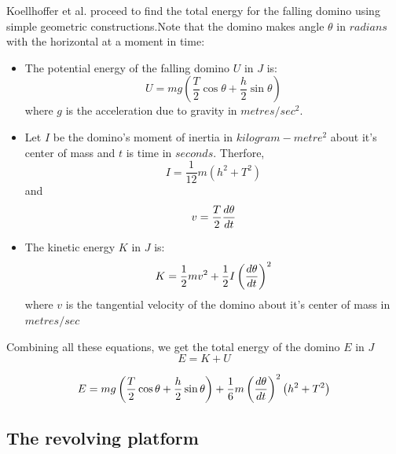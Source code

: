 \documentclass[11pt]{article}
\begin{document}
Koellhoffer et al. \cite{FallingDominoes} proceed to find the total energy for the falling domino using simple geometric constructions.Note that the domino makes angle $\theta$ in $radians$ with the horizontal at a moment in time:
\begin{itemize}
	\item The potential energy of the falling domino $U$ in $J$ is:
\begin{equation}
U = mg\left( \frac{T}{2} \cos\theta + \frac{h}{2}\sin\theta \right)
\end{equation}
	where $g$ is the acceleration due to gravity in $metres/{sec}^2$.
	\item Let $I$ be the domino's moment of inertia in $kilogram-metre^2$ about it's center of mass and $t$ is time in $seconds$. Therfore,
		\begin{equation}
			I = \frac{1}{12} m \left( h^2 + T^2 \right)
		\end{equation}
		and
		\begin{equation}
			v = \frac{T}{2}{d\theta \over dt}
		\end{equation}
	\item The kinetic energy $K$ in $J$ is:
	\begin{equation}
		K = \frac{1}{2} mv^2 + \frac{1}{2}I \left({d\theta \over dt}\right)^2
	\end{equation}
	where $v$ is the tangential velocity of the domino about it's center of mass in $metres/sec$
\end{itemize}

Combining all these equations, we get the total energy of the domino $E$ in $J$
\begin{equation}
	E = K + U
\end{equation}

\begin{equation}
	E = mg \left( \frac{T}{2} \cos\theta + \frac{h}{2} \sin\theta \right) + \frac{1}{6} m \left({d\theta \over dt}\right)^2 \left( h^2 + T^2 \right) 
\end{equation}

\subsection{The revolving platform}
\end{document}

